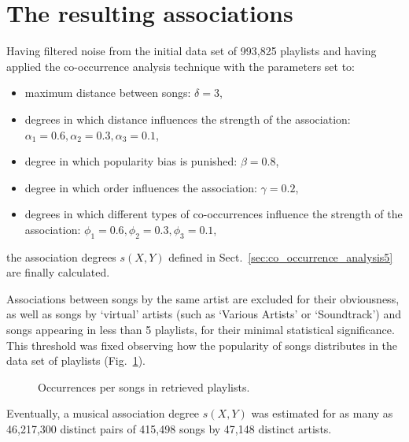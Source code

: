 \section{The resulting associations} %
\label{sub:the_smoothness_degrees_we_obtain}


Having filtered noise from the initial data set of 993,825 playlists and having applied the co-occurrence analysis technique with the parameters set to:
\begin{itemize}
 \item maximum distance between songs: $\delta = 3$,
 \item degrees in which distance influences the strength of the association: $\alpha_1 = 0.6, \alpha_2 = 0.3, \alpha_3 = 0.1$,
 \item degree in which popularity bias is punished:  $\beta = 0.8$,
 \item degree in which order influences %
 the association: $\gamma = 0.2$,
 \item degrees in which different types of co-occurrences influence the strength of the association: $\phi_1 = 0.6, \phi_2 = 0.3, \phi_3 = 0.1$,
\end{itemize}
the association degrees $s(X,Y)$ defined in Sect.~\ref{sec:co_occurrence_analysis5} are finally calculated.

Associations between songs by the same artist are excluded for their obviousness, as well as songs by `virtual' artists (such as `Various Artists' or `Soundtrack') and songs appearing in less than 5 playlists, for their minimal statistical significance.
This threshold was fixed observing how the popularity of songs distributes in the data set of playlists (Fig.~\ref{fig:lengths}).
%
\begin{figure}[hbtp]
\centering \setlength{\abovecaptionskip}{3pt}
\caption{Occurrences per songs in retrieved playlists.}
\label{fig:lengths}
\end{figure}

Eventually, a musical association degree $s(X,Y)$ was estimated for as many as 46,217,300 %
distinct pairs of 415,498 songs by 47,148 distinct artists.

